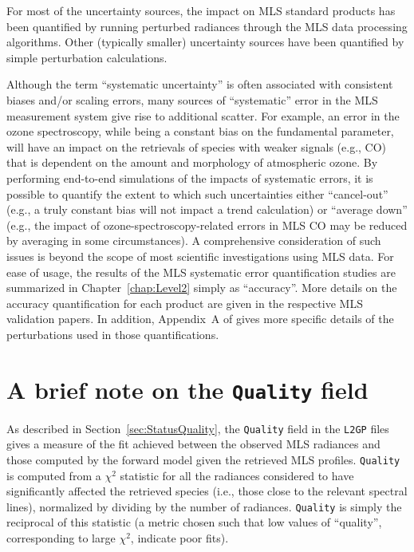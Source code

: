 For most of the uncertainty sources, the impact on MLS standard products has been quantified by running perturbed radiances through the MLS data processing algorithms. Other (typically smaller) uncertainty sources have been quantified by simple perturbation calculations.

Although the term ``systematic uncertainty'' is often associated with consistent biases and/or scaling errors, many sources of ``systematic'' error in the MLS measurement system give rise to additional scatter. For example, an error in the ozone spectroscopy, while being a constant bias on the fundamental parameter, will have an impact on the retrievals of species with weaker signals (e.g., CO) that is dependent on the amount and morphology of atmospheric ozone. By performing end-to-end simulations of the impacts of systematic errors, it is possible to quantify the extent to which such uncertainties either ``cancel-out'' (e.g., a truly constant bias will not impact a trend calculation) or ``average down'' (e.g., the impact of ozone-spectroscopy-related errors in MLS CO may be reduced by averaging in some circumstances).  A comprehensive consideration of such issues is beyond the scope of most scientific investigations using MLS data.  For ease of usage, the results of the MLS systematic error quantification studies are summarized in Chapter~\ref{chap:Level2} simply as ``accuracy''. More details on the accuracy quantification for each product are given in the respective \vii MLS validation papers. In addition, Appendix~A of \citet{ReadEtal:2007} gives more specific details of the perturbations used in those quantifications.

\section{A brief note on the \texttt{Quality} field}

As described in Section~\ref{sec:StatusQuality}, the \texttt{Quality} field in the \texttt{L2GP} files gives a measure of the fit achieved between the observed MLS radiances and those computed by the forward model given the retrieved MLS profiles. \texttt{Quality} is computed from a $\chi^2$ statistic for all the radiances considered to have significantly affected the retrieved species (i.e., those close to the relevant spectral lines), normalized by dividing by the number of radiances. \texttt{Quality} is simply the reciprocal of this statistic (a metric chosen such that low values of ``quality'', corresponding to large $\chi^2$, indicate poor fits).

